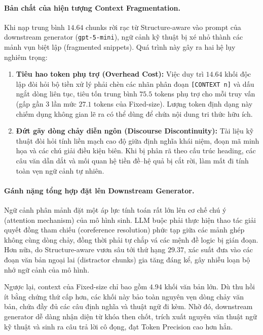 \paragraph{Bản chất của hiện tượng Context Fragmentation.}
Khi nạp trung bình $14.64$ chunks rời rạc từ Structure-aware vào prompt của downstream generator (\texttt{gpt-5-mini}), ngữ cảnh kỹ thuật bị xé nhỏ thành các mảnh vụn biệt lập (fragmented snippets). Quá trình này gây ra hai hệ lụy nghiêm trọng:
\begin{enumerate}
    \item \textbf{Tiêu hao token phụ trợ (Overhead Cost):} Việc duy trì $14.64$ khối độc lập đòi hỏi bộ tiền xử lý phải chèn các nhãn phân đoạn \texttt{[CONTEXT n]} và dấu ngắt dòng liên tục, tiêu tốn trung bình $75.5$ tokens phụ trợ cho mỗi truy vấn (gấp gần 3 lần mức $27.1$ tokens của Fixed-size). Lượng token định dạng này chiếm dụng không gian lẽ ra có thể dùng để chứa nội dung tri thức hữu ích.
    \item \textbf{Đứt gãy dòng chảy diễn ngôn (Discourse Discontinuity):} Tài liệu kỹ thuật đòi hỏi tính liền mạch cao độ giữa định nghĩa khái niệm, đoạn mã minh họa và các chú giải điều kiện biên. Khi bị phân rã theo cấu trúc heading, các câu văn dẫn dắt và mối quan hệ tiền đề--hệ quả bị cắt rời, làm mất đi tính toàn vẹn ngữ cảnh tự nhiên.
\end{enumerate}

\paragraph{Gánh nặng tổng hợp đặt lên Downstream Generator.}
Ngữ cảnh phân mảnh đặt một áp lực tính toán rất lớn lên cơ chế chú ý (attention mechanism) của mô hình sinh. LLM buộc phải thực hiện thao tác giải quyết đồng tham chiếu (coreference resolution) phức tạp giữa các mảnh ghép không cùng dòng chảy, đồng thời phải tự chắp vá các mệnh đề logic bị gián đoạn. Hơn nữa, do Structure-aware vươn sâu tới thứ hạng $29.37$, xác suất đưa vào các đoạn văn bản ngoại lai (distractor chunks) gia tăng đáng kể, gây nhiễu loạn bộ nhớ ngữ cảnh của mô hình.

Ngược lại, context của Fixed-size chỉ bao gồm $4.94$ khối văn bản lớn. Dù thu hồi ít bằng chứng thứ cấp hơn, các khối này bảo toàn nguyên vẹn dòng chảy văn bản, chứa đầy đủ các câu định nghĩa và thuật ngữ đi kèm. Nhờ đó, downstream generator dễ dàng nhận diện từ khóa then chốt, trích xuất nguyên văn thuật ngữ kỹ thuật và sinh ra câu trả lời cô đọng, đạt Token Precision cao hơn hẳn.

